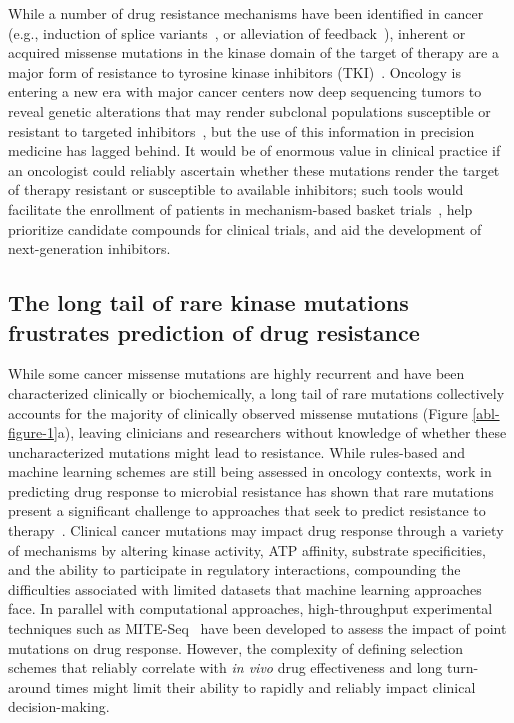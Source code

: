 \documentclass[phd,tocprelim]{cornell}
\begin{document}
  While a number of drug resistance mechanisms have been identified in cancer (e.g., induction of splice variants~\citep{Gruber2006}, or alleviation of feedback~\citep{Chandarlapaty:CancerCell:2011}), inherent or acquired missense mutations in the kinase domain of the target of therapy are a major form of resistance to tyrosine kinase inhibitors (TKI)~\citep{Knight:Nat.Rev.Cancer:2010,Holohan:Nat.Rev.Cancer:2013,Housman:Cancers:2014}.
  Oncology is entering a new era with major cancer centers now deep sequencing tumors to reveal genetic alterations that may render subclonal populations susceptible or resistant to targeted inhibitors~\citep{Zehir:Nat.Med.:2017}, but the use of this information in precision medicine has lagged behind. 
  It would be of enormous value in clinical practice if an oncologist could reliably ascertain whether these mutations render the target of therapy resistant or susceptible to available inhibitors; such tools would facilitate the enrollment of patients in mechanism-based basket trials~\citep{Redig::2015,Hyman:Cell:2017}, help prioritize candidate compounds for clinical trials, and aid the development of next-generation inhibitors. 

\subsection{The long tail of rare kinase mutations frustrates prediction of drug resistance}
  While some cancer missense mutations are highly recurrent and have been characterized clinically or biochemically, a long tail of rare mutations collectively accounts for the majority of clinically observed missense mutations (Figure \ref{abl-figure-1}a), leaving clinicians and researchers without knowledge of whether these uncharacterized mutations might lead to resistance.
  While rules-based and machine learning schemes are still being assessed in oncology contexts, work in predicting drug response to microbial resistance has shown that rare mutations present a significant challenge to approaches that seek to predict resistance to therapy~\citep{Pesesky:Front.Microbiol.:2016}.
    Clinical cancer mutations may impact drug response through a variety of mechanisms by altering kinase activity, ATP affinity, substrate specificities, and the ability to participate in regulatory interactions, compounding the difficulties associated with limited datasets that machine learning approaches face.
  In parallel with computational approaches, high-throughput experimental techniques such as MITE-Seq~\citep{Melnikov:NucleicAcidsRes.:2014} have been developed to assess the impact of point mutations on drug response. 
  However, the complexity of defining selection schemes that reliably correlate with \emph{in vivo} drug effectiveness and long turn-around times might limit their ability to rapidly and reliably impact clinical decision-making.
\end{document}
